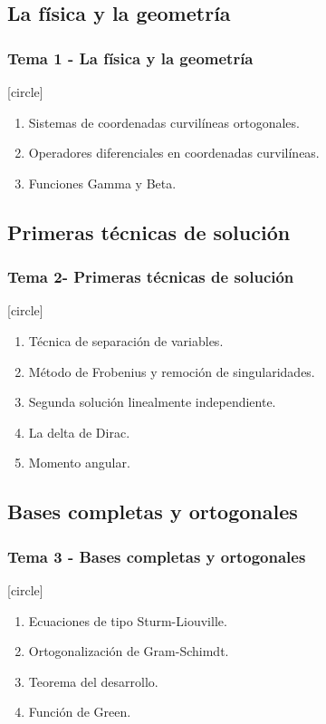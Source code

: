 \subsection{La física y la geometría}
\begin{frame}
\frametitle{Tema 1 - La física y la geometría}
[circle]
\begin{enumerate}[<+->]
\item Sistemas de coordenadas curvilíneas ortogonales.
\item Operadores diferenciales en coordenadas curvilíneas.
\item Funciones Gamma y Beta.
\end{enumerate}
\end{frame}
\subsection{Primeras técnicas de solución}
\begin{frame}
\frametitle{Tema 2- Primeras técnicas de solución}
[circle]
\begin{enumerate}[<+->]
\item Técnica de separación de variables.
\item Método de Frobenius y remoción de singularidades.
\item Segunda solución linealmente independiente.
\item La delta de Dirac.
\item Momento angular.
\end{enumerate}
\end{frame}
\subsection{Bases completas y ortogonales}
\begin{frame}
\frametitle{Tema 3 - Bases completas y ortogonales}
[circle]
\begin{enumerate}[<+->]
\item Ecuaciones de tipo Sturm-Liouville.
\item Ortogonalización de Gram-Schimdt.
\item Teorema del desarrollo.
\item Función de Green.   
\end{enumerate}
\end{frame}
